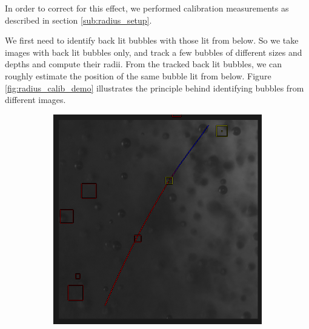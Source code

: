 			In order to correct for this effect, we performed calibration measurements as described in section \ref{sub:radius_setup}.
			
			We first need to identify back lit bubbles with those lit from below. So we take images with back lit bubbles only, and track a few bubbles of different sizes and depths and compute their radii. From the tracked back lit bubbles, we can roughly estimate the position of the same bubble lit from below. Figure \ref{fig:radius_calib_demo} illustrates the principle behind identifying bubbles from different images. 
			
			\begin{figure}	
				\centering
				\begin{subfigure}[t]{.55\textwidth}
					\centering
					\includegraphics[scale=0.5]{images/tracking_green.png}
					\caption{}
					\label{subfig:green_1}
				\end{subfigure}
				

\end{figure}
